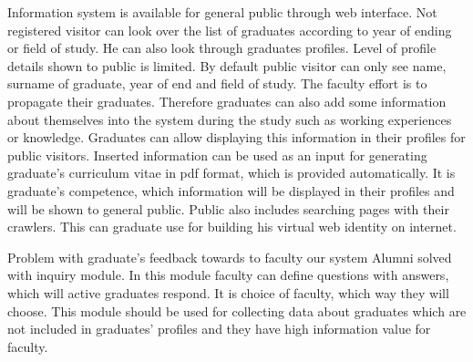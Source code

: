 \documentclass{iitsrc}[2006/14/02]
\begin{document}
Information system is available for general public through web interface. Not registered visitor can look over the list of graduates according to year of ending or field of study. He can also look through graduates profiles. Level of profile details shown to public is limited. By default public visitor can only see name, surname of graduate, year of end and field of study. The faculty effort is to propagate their graduates. Therefore graduates can also add some information about themselves into the system during the study such as working experiences or knowledge. Graduates can allow displaying this information in their profiles for public visitors. Inserted information can be used as an input for generating graduate’s curriculum vitae in pdf format, which is provided automatically. It is graduate’s competence, which information will be displayed in their profiles and will be shown to general public. Public also includes searching pages with their crawlers. This can graduate use for building his virtual web identity on internet. 

Problem with graduate’s feedback towards to faculty our system Alumni solved with inquiry module. In this module faculty can define questions with answers, which will active graduates respond. It is choice of faculty, which way they will choose. This module should be used for collecting data about graduates which are not included in graduates’ profiles and they have high information value for faculty.

  

\nocite{team14}
\nocite{team15}
\nocite{cakephp}



\end{document}
